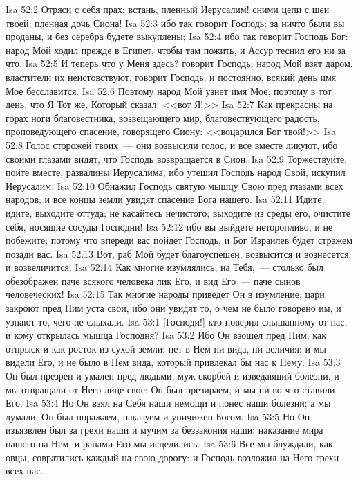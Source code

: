 \vs Isa 52:2 Отряси с себя прах; встань, пленный Иерусалим! сними цепи с шеи твоей, пленная дочь Сиона!
\vs Isa 52:3 ибо так говорит Господь: за ничто были вы проданы, и без серебра будете выкуплены;
\vs Isa 52:4 ибо так говорит Господь Бог: народ Мой ходил прежде в Египет, чтобы там пожить, и Ассур теснил его ни за что.
\vs Isa 52:5 И теперь что у Меня здесь? говорит Господь; народ Мой взят даром, властители их неистовствуют, говорит Господь, и постоянно, всякий день имя Мое бесславится.
\vs Isa 52:6 Поэтому народ Мой узнет имя Мое; поэтому  в тот день, что Я Тот же, Который сказал: <<вот Я!>>
\vs Isa 52:7 Как прекрасны на горах ноги благовестника, возвещающего мир, благовествующего радость, проповедующего спасение, говорящего Сиону: <<воцарился Бог твой!>>
\vs Isa 52:8 Голос сторожей твоих~--- они возвысили голос, и все вместе ликуют, ибо своими глазами видят, что Господь возвращается в Сион.
\vs Isa 52:9 Торжествуйте, пойте вместе, развалины Иерусалима, ибо утешил Господь народ Свой, искупил Иерусалим.
\vs Isa 52:10 Обнажил Господь святую мышцу Свою пред глазами всех народов; и все концы земли увидят спасение Бога нашего.
\vs Isa 52:11 Идите, идите, выходите оттуда; не касайтесь нечистого; выходите из среды его, очистите себя, носящие сосуды Господни!
\vs Isa 52:12 ибо вы выйдете неторопливо, и не побежите; потому что впереди вас пойдет Господь, и Бог Израилев будет стражем позади вас.
\vs Isa 52:13 Вот, раб Мой будет благоуспешен, возвысится и вознесется, и возвеличится.
\vs Isa 52:14 Как многие изумлялись,  на Тебя,~--- столько был обезображен паче всякого человека лик Его, и вид Его~--- паче сынов человеческих!
\vs Isa 52:15 Так многие народы приведет Он в изумление; цари закроют пред Ним уста свои, ибо они увидят то, о чем не было говорено им, и узнают то, чего не слыхали.
\vs Isa 53:1 [Господи!] кто поверил слышанному от нас, и кому открылась мышца Господня?
\vs Isa 53:2 Ибо Он взошел пред Ним, как отпрыск и как росток из сухой земли; нет в Нем ни вида, ни величия; и мы видели Его, и не было в Нем вида, который привлекал бы нас к Нему.
\vs Isa 53:3 Он был презрен и умален пред людьми, муж скорбей и изведавший болезни, и мы отвращали от Него лице свое; Он был презираем, и мы ни во что ставили Его.
\vs Isa 53:4 Но Он взял на Себя наши немощи и понес наши болезни; а мы думали,  Он был поражаем, наказуем и уничижен Богом.
\vs Isa 53:5 Но Он изъязвлен был за грехи наши и мучим за беззакония наши; наказание мира нашего  на Нем, и ранами Его мы исцелились.
\vs Isa 53:6 Все мы блуждали, как овцы, совратились каждый на свою дорогу: и Господь возложил на Него грехи всех нас.
